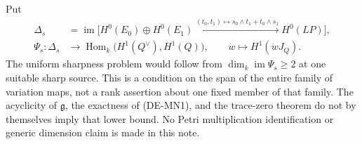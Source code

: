 \begin{remark}
\label{rem:DE-A3-positive-monad-gate-note}
Put
\[
\begin{split}
\Delta_s&=\operatorname{im}\bigl[H^0(E_0)\oplus H^0(E_1)
\xrightarrow{(t_0,t_1)\mapsto s_0\wedge t_1+t_0\wedge s_1}
H^0(LP)\bigr],\\
\Psi_s:\Delta_s&\longrightarrow
\operatorname{Hom}_k\bigl(H^1(Q^\vee),H^1(Q)\bigr),
\qquad \dot w\longmapsto H^1(\dot wJ_Q).
\end{split}
\]
The uniform sharpness problem would follow from
$\dim_k\operatorname{im}\Psi_s\ge2$ at one suitable sharp source.
This is a condition on the span of the entire family of variation
maps, not a rank assertion about one fixed member of that family.
The acyclicity of $\mathfrak g$,
the exactness of (DE-MN1), and the trace-zero theorem do not by
themselves imply that lower bound. No Petri multiplication
identification or generic dimension claim is made in this note.
\end{remark}
